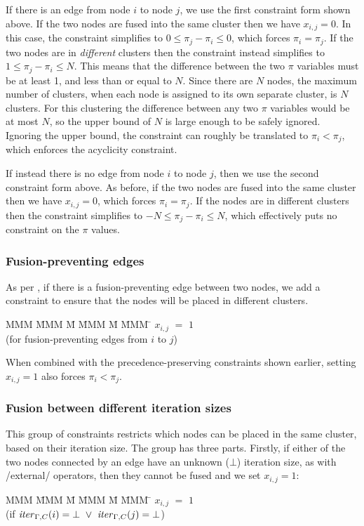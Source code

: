 If there is an edge from node $i$ to node $j$, we use the first constraint form shown above.
If the two nodes are fused into the same cluster then we have $x_{i,j} = 0$.
In this case, the constraint simplifies to $0 \le \pi_j - \pi_i \le 0$, which forces $\pi_i = \pi_j$.
If the two nodes are in \emph{different} clusters then the constraint instead simplifies to $1 \le \pi_j - \pi_i \le N$.
This means that the difference between the two $\pi$ variables must be at least 1, and less than or equal to $N$.
Since there are $N$ nodes, the maximum number of clusters, when each node is assigned to its own separate cluster, is $N$ clusters.
For this clustering the difference between any two $\pi$ variables would be at most $N$, so the upper bound of $N$ is large enough to be safely ignored.
Ignoring the upper bound, the constraint can roughly be translated to $\pi_i < \pi_j$, which enforces the acyclicity constraint.

If instead there is no edge from node $i$ to node $j$, then we use the second constraint form above.
As before, if the two nodes are fused into the same cluster then we have $x_{i,j} = 0$, which forces $\pi_i = \pi_j$.
If the nodes are in different clusters then the constraint simplifies to $-N \le \pi_j - \pi_i \le N$, which effectively puts no constraint on the $\pi$ values.


\subsubsection{Fusion-preventing edges}
As per \citet{megiddo1998optimal}, if there is a fusion-preventing edge between two nodes, we add a constraint to ensure that the nodes will be placed in different clusters.
\begin{tabbing}
MMM     \= MMM \= M  \= MMM \= M \= MMM \= \kill
        \> $x_{i,j}$ \> $=$ \> $1$ \>   \> \\
        \> (for fusion-preventing edges from $i$ to $j$) 
\end{tabbing}

When combined with the precedence-preserving constraints shown earlier, setting $x_{i,j} = 1$ also forces $\pi_i < \pi_j$. 


\subsubsection{Fusion between different iteration sizes}
This group of constraints restricts which nodes can be placed in the same cluster, based on their iteration size.
The group has three parts. 
Firstly, if either of the two nodes connected by an edge have an unknown ($\bot$) iteration size, as with \Hs/external/ operators, then they cannot be fused and we set $x_{i,j} = 1$:
\begin{tabbing}
MMM     \= MMM \= M \= MMM \= M \= MMM \= \kill
        \> $x_{i,j}$   \> $=$   \> $1$          \>       \>     \\
        \> (if $\mathit{iter}_{\Gamma,C}(i) = \bot 
                ~\vee~ \mathit{iter}_{\Gamma,C}(j) = \bot$)
\end{tabbing}

